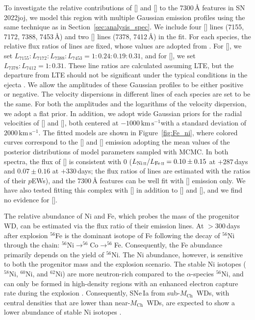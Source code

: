 \documentclass[twocolumn]{aastex631}
\newcommand{\sn}{SN\,2022joj}
\newcommand{\Mch}{$M_\mathrm{Ch}$}
\newcommand{\kms}{$\mathrm{km}\,\mathrm{s}^{-1}$}
\newcommand{\chang}[1]{\textcolor{blue}{[Chang: #1]}}
\begin{document}
\begin{CJK*}{UTF8}{gbsn}
To investigate the relative contributions of [] and [] to the 7300\,\r{A} features in \sn, we model this region with multiple Gaussian emission profiles using the same technique as in Section~\ref{sec:analysis_spec}. We include four [] lines (7155, 7172, 7388, 7453\,\r{A}) and two [] lines (7378, 7412\,\r{A}) in the fit. For each species, the relative flux ratios of lines are fixed, whose values are adopted from \citet{Jerkstrand_2015}. For [], we set $L_{7155}:L_{7172}:L_{7388}:L_{7453} = 1:0.24:0.19:0.31$, and for [], we set $L_{7378}:L_{7412} = 1:0.31$. These line ratios are calculated assuming LTE, but the departure from LTE should not be significant under the typical conditions in the ejecta \citep{Jerkstrand_2015}. We allow the amplitudes of these Gaussian profiles to be either positive or negative. The velocity dispersions in different lines of each species are set to be the same. For both the amplitudes and the logarithms of the velocity dispersion, we adopt a flat prior. In addition, we adopt wide Gaussian priors for the radial velocities of [] and [], both centered at $-1000$\,\kms with a standard deviation of $2000$\,\kms. The fitted models are shown in Figure~\ref{fig:Fe_ni}, where colored curves correspond to the [] and [] emission adopting the mean values of the posterior distributions of model parameters sampled with MCMC. In both spectra, the flux of [] is consistent with 0 (${L_{\mathrm{Ni}\,\textsc{ii}}}/{L_{\mathrm{Fe}\,\textsc{ii}}}=0.10\pm0.15$ at $+287$\,days and $0.07\pm0.16$ at $+330$\,days; the flux ratios of lines are estimated with the ratios of their $p$EWs), and the 7300\,\r{A} features can be well fit with [] emission only. We have also tested fitting this complex with [] in addition to [] and [], and we find no evidence for []. %

The relative abundance of Ni and Fe, which probes the mass of the progenitor WD, can be estimated via the flux ratio of their emission lines. At $>$300\,days after explosion $^{56}$Fe is the dominant isotope of Fe following the decay of $^{56}$Ni through the chain: $^{56}$Ni$\rightarrow^{56}$Co$\rightarrow^{56}$Fe. Consequently, the Fe abundance primarily depends on the yield of $^{56}$Ni. The Ni abundance, however, is sensitive to both the progenitor mass and the explosion scenario. The stable Ni isotopes ($^{58}$Ni, $^{60}$Ni, and $^{62}$Ni) are more neutron-rich compared to the $\alpha$-species $^{56}$Ni, and can only be formed in high-density regions with an enhanced electron capture rate during the explosion \citep{Nomoto_1984,Khokhlov_1991}. Consequently, SNe\,Ia from sub-\Mch\ WDs, with central densities that are lower than near-\Mch\ WDs, are expected to show a lower abundance of stable Ni isotopes \citep{Iwamoto_1999,Seitenzahl_2013,Shen_DD_2018}. 


\end{CJK*}
\end{document}
